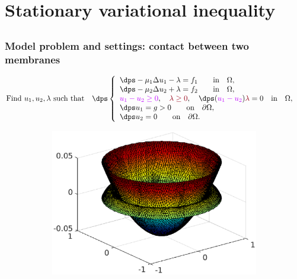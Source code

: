 \section{Stationary variational inequality}
\subsection{}
\begin{frame}
\frametitle{Model problem and settings: contact between two membranes}
\vspace{-1.7 cm}
\begin{equation*}
\mbox{Find} \ u_1, u_2, \lambda \ \mbox{such that} \quad
\dps
\left\lbrace\begin{array}{llccc}
\dps -\mu_1 \Delta u_1-\lambda = f_1 \qquad \mbox{in} \quad \Omega, \\
\dps -\mu_2 \Delta u_2+\lambda = f_2 \qquad \mbox{in} \quad \Omega,\\
\textcolor{electricpurple}{u_1-u_2 \geq 0}, \quad 
\textcolor{carmine}{\lambda \geq 0}, \quad \dps (\textcolor{electricpurple}{u_1-u_2})\textcolor{carmine}{\lambda}=0 \quad \mbox{in} \quad \Omega, \hspace{0.2 cm}\\
\dps u_1=g > 0 \qquad \mbox{on} \quad\partial \Omega,\\
\dps u_2=0 \qquad \mbox{on} \quad\partial \Omega.
\end{array}
\right.
\end{equation*}
\vspace{-0.8 cm}
\begin{figure}
\begin{subfigure}[normal]{0.44\textwidth} 
\includegraphics[width=\textwidth]{fig_article_chap_1/fig_membrane_cv.eps}    

\end{subfigure}
\end{figure}
\end{frame}

